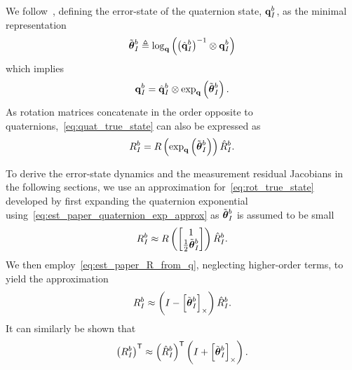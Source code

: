 We follow~\cite{koch2017relative}, defining the error-state of the quaternion
state,
$\boldsymbol{\mathrm{q}}_I^b$,
as the minimal representation
\begin{equation}
  \tilde{\boldsymbol{\mathrm{\theta}}}_I^b \triangleq \log_{\boldsymbol{\mathrm{q}}} \left( \left( \hat{\boldsymbol{\mathrm{q}}}_I^b \right)^{-1}
  \otimes \boldsymbol{\mathrm{q}}_I^b \right)
  \label{eq:quat_error_state}
\end{equation}
which implies
\begin{equation}
  \boldsymbol{\mathrm{q}}_I^b  = \hat{\boldsymbol{\mathrm{q}}}_I^b \otimes \exp_{\boldsymbol{\mathrm{q}}} \left( \tilde{\boldsymbol{\mathrm{\theta}}}_I^b
  \right).
  \label{eq:quat_true_state}
\end{equation}
As rotation matrices concatenate in the order opposite to
quaternions,~\eqref{eq:quat_true_state} can also be expressed as
\begin{equation}
  R_I^b  = R \left( \exp_{\boldsymbol{\mathrm{q}}} \left( \tilde{\boldsymbol{\mathrm{\theta}}}_I^b \right) \right)
  \hat{R}_I^b.
  \label{eq:rot_true_state}
\end{equation}

To derive the error-state dynamics and the measurement residual Jacobians in the
following sections, we
use an approximation for~\eqref{eq:rot_true_state} developed by first expanding
the
quaternion exponential using~\eqref{eq:est_paper_quaternion_exp_approx} as
$\tilde{\boldsymbol{\mathrm{\theta}}}_I^b$ is assumed to be small
\begin{equation}
  R_I^b  \approx R \left( \begin{bmatrix}
      1 \\
    \frac{1}{2} \tilde{\boldsymbol{\mathrm{\theta}}}_I^b
  \end{bmatrix}\right)
  \hat{R}_I^b.
\end{equation}
We then employ~\eqref{eq:est_paper_R_from_q}, neglecting higher-order terms, to
yield the approximation
\begin{equation}
  R_I^b  \approx 
  \left( I - \left[ \tilde{\boldsymbol{\mathrm{\theta}}}_I^b \right]_{\times} \right)
  \hat{R}_I^b.
  \label{eq:est_paper_Rapprox}
\end{equation}
It can similarly be shown that
\begin{equation}
  \left( R_I^b \right)^{\mathsf{T}}  \approx 
  \left( \hat{R}_I^b \right)^{\mathsf{T}}
  \left( I + \left[ \tilde{\boldsymbol{\mathrm{\theta}}}_I^b \right]_{\times} \right).
  \label{eq:est_paper_RTapprox}
\end{equation}




